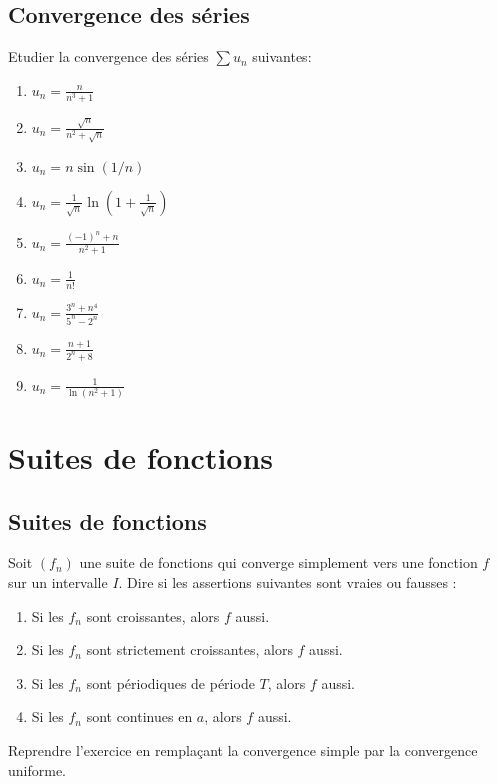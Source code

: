 \subsection{Convergence des séries}
    Etudier la convergence des séries $\sum u_n$ suivantes:
    \begin{multicols}{2}
    \begin{enumerate}[itemsep = 0.5em]
      \item $u_n=\frac{n}{n^3+1}$
      \item $u_n=\frac{\sqrt{n}}{n^2+\sqrt{n}}$
      \item $u_n=n \sin (1 / n)$
      \item $u_n=\frac{1}{\sqrt{n}} \ln \left(1+\frac{1}{\sqrt{n}}\right)$
      \item $u_n=\frac{(-1)^n+n}{n^2+1}$
      \item $u_n=\frac{1}{n!}$
      \item $u_n=\frac{3^n+n^4}{5^n-2^n}$
      \item $u_n=\frac{n+1}{2^n+8}$
      \item $u_n=\frac{1}{\ln \left(n^2+1\right)}$
    \end{enumerate}
    \end{multicols}
    
    
    
\section*{Suites de fonctions}

\subsection{Suites de fonctions}
Soit $\left(f_n\right)$ une suite de fonctions qui converge simplement vers une fonction $f$ sur un intervalle $I$. Dire si les assertions suivantes sont vraies ou fausses :
\begin{enumerate}[label = \alph*)]
  \item Si les $f_n$ sont croissantes, alors $f$ aussi.
  \item Si les $f_n$ sont strictement croissantes, alors $f$ aussi.
  \item Si les $f_n$ sont périodiques de période $T$, alors $f$ aussi.
  \item Si les $f_n$ sont continues en $a$, alors $f$ aussi.
\end{enumerate}

Reprendre l'exercice en remplaçant la convergence simple par la convergence uniforme.

